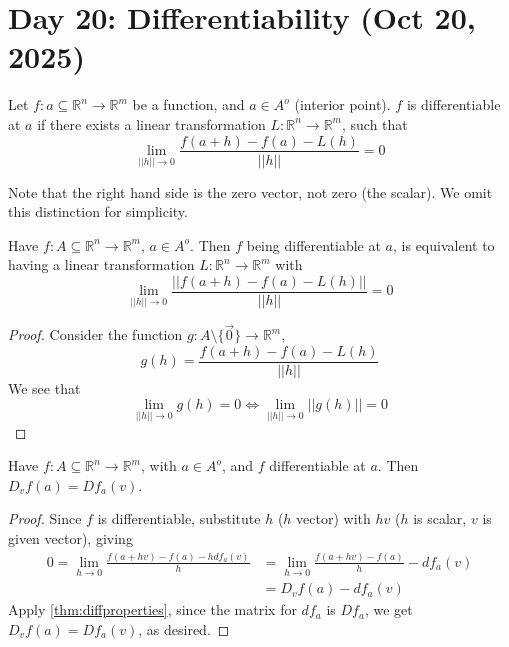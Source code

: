\section{Day 20: Differentiability (Oct 20, 2025)} \label{sec:differentiability}

\begin{definition}[Differentiable]
Let $f : a \subseteq \mathbb{R}^n \to \mathbb{R}^m$ be a function, and $a \in A^o$ (interior point). $f$ is differentiable at $a$ if there exists a linear transformation $L : \mathbb{R}^n \to \mathbb{R}^m$, such that
\[
    \lim_{ ||h|| \to 0 } \frac{f(a + h) - f(a) - L(h)}{||h||} = 0
\]
\end{definition}

\noindent Note that the right hand side is the zero vector, not zero (the scalar). We omit this distinction for simplicity.

\begin{simplethm} \label{thm:altdiff}
Have $f : A \subseteq \mathbb{R}^n \to \mathbb{R}^m$, $a \in A^o$. Then $f$ being differentiable at $a$, is equivalent to having a linear transformation $L : \mathbb{R}^n \to \mathbb{R}^m$ with 
\[
    \lim_{ ||h|| \to 0 } \frac{||f(a+h) - f(a) - L(h)||}{||h||} = 0
\]
\end{simplethm}

\begin{proof}
    Consider the function $g : A \setminus \{ \vec{0} \} \to \mathbb{R}^m$,
\[
    g(h) = \frac{f(a+h) - f(a) - L(h)}{||h||}
\]
We see that 
\[
    \lim_{ ||h|| \to 0 } g(h) = 0 \iff \lim_{ ||h|| \to 0 } ||g(h)|| = 0
\]
\end{proof}

\begin{simplethm} \label{thm:dirdercomp}
    Have $f : A \subseteq \mathbb{R}^n \to \mathbb{R}^m$, with $a \in A^o$, and $f$ differentiable at $a$. Then $D_vf(a) = Df_a(v)$.
\end{simplethm}

\begin{proof}
    Since $f$ is differentiable, substitute $h$ ($h$ vector) with $hv$ ($h$ is scalar, $v$ is given vector), giving
    \begin{align*}
        0 = \lim_{ h \to 0 } \frac{f(a + hv) - f(a) - hdf_a(v)}{h} &= \lim_{ h \to 0 } \frac{f(a + hv) - f(a)}{h} - df_a(v)\\
        &= D_vf(a) - df_a(v)
    \end{align*}
    Apply \ref{thm:diffproperties}, since the matrix for $df_a$ is $Df_a$, we get $D_vf(a) = Df_a(v)$, as desired.
\end{proof}

